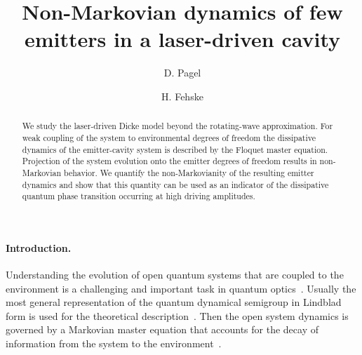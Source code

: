 \documentclass[aps,pra,twocolumn,showpacs,showkeys,10pt,nofootinbib]{revtex4-1}
\begin{document}
\title{Non-Markovian dynamics of few emitters in a laser-driven cavity}

\author{D. Pagel}
\author{H. Fehske}

\begin{abstract}

We study the laser-driven Dicke model beyond the rotating-wave approximation.
For weak coupling of the system to environmental degrees of freedom the dissipative dynamics of the emitter-cavity system is described by the Floquet master equation.
Projection of the system evolution onto the emitter degrees of freedom results in non-Markovian behavior.
We quantify the non-Markovianity of the resulting emitter dynamics and show that this quantity can be used as an indicator of the dissipative quantum phase transition occurring at high driving amplitudes.

\end{abstract}



\maketitle

\paragraph*{Introduction.}
Understanding the evolution of open quantum systems that are coupled to the environment is a challenging and important task in quantum optics~\cite{car99, bp02, aga13}.
Usually the most general representation of the quantum dynamical semigroup in Lindblad form is used for the theoretical description~\cite{gks76, lin76}.
Then the open system dynamics is governed by a Markovian master equation that accounts for the decay of information from the system to the environment~\cite{alz06, bgb11, sch14}.
\end{document}
